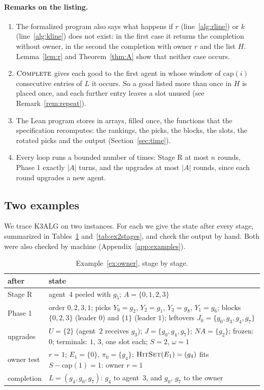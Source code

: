 \documentclass[runningheads,11pt]{llncs}
\newcommand{\NA}{\mathit{NA}}
\newcommand{\capa}{\mathrm{cap}}
\newcommand{\HitSet}{\textup{\textsc{HitSet}}}
\newcommand{\Complete}{\textup{\textsc{Complete}}}
\begin{document}
\paragraph{Remarks on the listing.}
\begin{enumerate}
\item The formalized program also says what happens if $r$ (line~\ref{alg:rline}) or $k$ (line~\ref{alg:kline}) does not exist: in the first case it returns the completion without owner, in the second the completion with owner $r$ and the list $H$. Lemma~\ref{lem:r} and Theorem~\ref{thm:A} show that neither case occurs.
\item $\Complete$ gives each good to the first agent in whose window of $\capa(i)$ consecutive entries of $L$ it occurs. So a good listed more than once in $H$ is placed once, and each further entry leaves a slot unused (see Remark~\ref{rem:repeat}).
\item The Lean program stores in arrays, filled once, the functions that the specification recomputes: the rankings, the picks, the blocks, the slots, the rotated picks and the output (Section~\ref{sec:time}).
\item Every loop runs a bounded number of times: Stage R at most $n$ rounds, Phase 1 exactly $|A|$ turns, and the upgrades at most $|A|$ rounds, since each round upgrades a new agent.
\end{enumerate}

\subsection{Two examples}\label{sec:examples}

We trace K3ALG on two instances. For each we give the state after every stage, summarized in Tables~\ref{tab:ex1stages} and~\ref{tab:ex2stages}, and check the output by hand. Both were also checked by machine (Appendix~\ref{app:examples}).

\begin{table}[tbp]
\caption{Example~\ref{ex:owner}, stage by stage.}\label{tab:ex1stages}
\centering\small
\setlength{\tabcolsep}{4pt}\begin{tabular}{@{}>{\raggedright\arraybackslash}p{}>{\raggedright\arraybackslash}p{}@{}}
\toprule
after & state \\
\midrule
Stage R & agent~$4$ peeled with $g_5$; $A=\{0,1,2,3\}$ \\
Phase 1 & order $0,2,3,1$; picks $Y_0=g_2$, $Y_2=g_1$, $Y_3=g_8$, $Y_1=g_6$; blocks $\{0,2,3\}$ (leader $0$) and $\{1\}$ (leader $1$); leftovers $J_0=\{g_0,g_3,g_4,g_7\}$ \\
upgrades & $U=\{2\}$ (agent~$2$ receives $g_3$); $J=\{g_0,g_4,g_7\}$; $\NA=\{g_2\}$; frozen: $0$; terminals: $1$, $3$, one slot each; $S=2$, $\omega=1$ \\
owner test & $r=1$; $E_1=\{0\}$, $\pi_0=\{g_4\}$; $\HitSet(E_1)=(g_4)$ fits $S-\capa(1)=1$: owner $r=1$ \\
completion & $L=(g_4,g_0,g_7)$: $g_4$ to agent~$3$, and $g_0$, $g_7$ to the owner \\
\bottomrule
\end{tabular}
\end{table}
\end{document}
